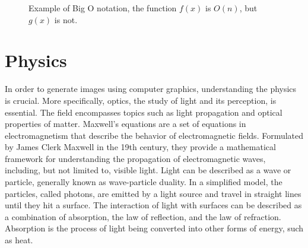 \begin{figure}[H]
  \centering
  \caption{Example of Big O notation, the function $f(x)$ is $O(n)$, but $g(x)$ is not.}
  \label{fig:big-o-visualization}
\end{figure}

\section{Physics}
\label{ch:physics}

In order to generate images using computer graphics, understanding the physics is crucial. More specifically, optics, the study of light and its perception, is essential. The field encompasses topics such as light propagation and optical properties of matter. Maxwell's equations are a set of equations in electromagnetism that describe the behavior of electromagnetic fields. Formulated by James Clerk Maxwell in the 19th century, they provide a mathematical framework for understanding the propagation of electromagnetic waves, including, but not limited to, visible light. Light can be described as a wave or particle, generally known as wave-particle duality. \cite{fowles1989introduction} In a simplified model, the particles, called photons, are emitted by a light source and travel in straight lines until they hit a surface. The interaction of light with surfaces can be described as a combination of absorption, the law of reflection, and the law of refraction. Absorption is the process of light being converted into other forms of energy, such as heat.

